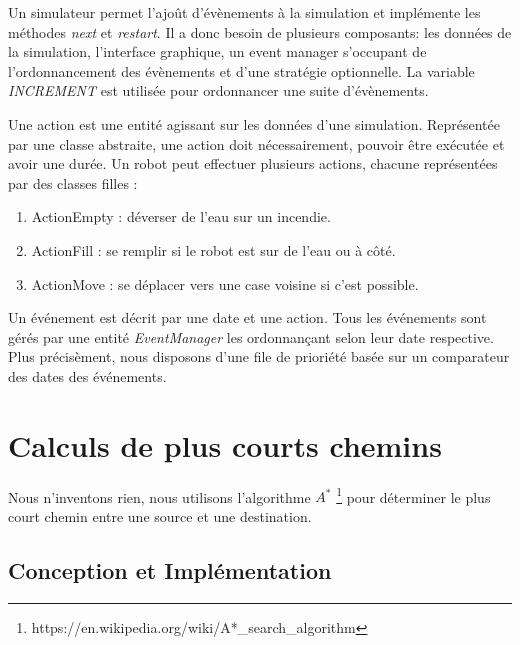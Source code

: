 \documentclass[a4paper, 10pt, french]{article}
\begin{document}
	Un simulateur permet l'ajoût d'évènements à la simulation et implémente les méthodes {\it next} et {\it restart}. Il a donc besoin de plusieurs composants: les données de la simulation, l'interface graphique, un event manager s'occupant de l'ordonnancement des évènements et d'une stratégie optionnelle. La variable {\it INCREMENT} est utilisée pour ordonnancer une suite d'évènements. 
	\par\leavevmode\par
	Une action est une entité agissant sur les données d'une simulation. Représentée par une classe abstraite, une action doit nécessairement, pouvoir être exécutée et avoir une durée.
	Un robot peut effectuer plusieurs actions, chacune représentées par des classes filles :
	\begin{enumerate}
		\item ActionEmpty : déverser de l'eau sur un incendie.
		\item ActionFill : se remplir si le robot est sur de l'eau ou à côté.
		\item ActionMove : se déplacer vers une case voisine si c'est possible.
	\end{enumerate}
	\par\leavevmode\par
	Un événement est décrit par une date et une action. Tous les événements sont gérés par une entité {\it EventManager} les ordonnan{\c c}ant selon leur date respective. Plus précisèment, nous disposons d'une file de prioriété basée sur un comparateur des dates des événements.  

\section{Calculs de plus courts chemins}

	Nous n'inventons rien, nous utilisons l'algorithme $A^*$ \footnote{https://en.wikipedia.org/wiki/A*\_search\_algorithm} pour déterminer le plus court chemin entre une source et une destination. 

	\subsection{Conception et Implémentation}
\end{document}
